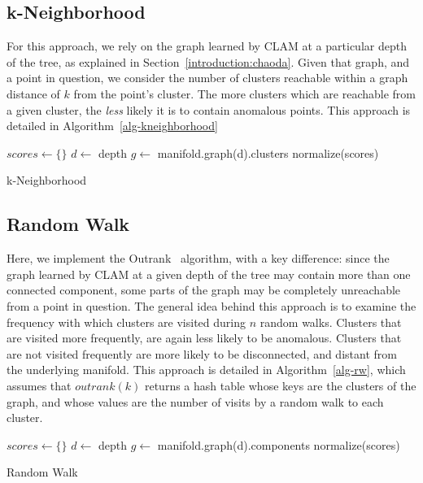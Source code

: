 \subsection{k-Neighborhood}

For this approach, we rely on the graph learned by CLAM at a particular depth of the tree, as explained in Section~\ref{introduction:chaoda}. Given that graph, and a point in question, we consider the number of clusters reachable within a graph distance of $k$ from the point's cluster.
The more clusters which are reachable from a given cluster, the \textit{less} likely it is to contain anomalous points. This approach is detailed in Algorithm~\ref{alg-kneighborhood}

\begin{algorithm}
\DontPrintSemicolon
\SetAlgoLined
{}
 $scores \leftarrow \{\}$\;
 $d \leftarrow $ depth\;
 $g \leftarrow $ manifold.graph(d).clusters\;
 normalize(scores)\;
 \caption{k-Neighborhood}
 \label{alg-kneighborhood}
\end{algorithm}

\subsection{Random Walk}

Here, we implement the Outrank~\cite{moonesinghe2008outrank} algorithm, with a key difference: since the graph learned by CLAM at a given depth of the tree may contain more than one connected component, some parts of the graph may be completely unreachable from a point in question.
The general idea behind this approach is to examine the frequency with which clusters are visited during $n$ random walks.
Clusters that are visited more frequently, are again less likely to be anomalous.
Clusters that are not visited frequently are more likely to be disconnected, and distant from the underlying manifold. This approach is detailed in Algorithm~\ref{alg-rw}, which assumes that $outrank(k)$ returns a hash table whose keys are the clusters of the graph, and whose values are the number of visits by a random walk to each cluster.

\begin{algorithm}
\DontPrintSemicolon
\SetAlgoLined
{}
 $scores \leftarrow \{\}$\;
 $d \leftarrow $ depth\;
 $g \leftarrow $ manifold.graph(d).components\;
 normalize(scores)\;
 \caption{Random Walk}
 \label{alg-rw}
\end{algorithm}

